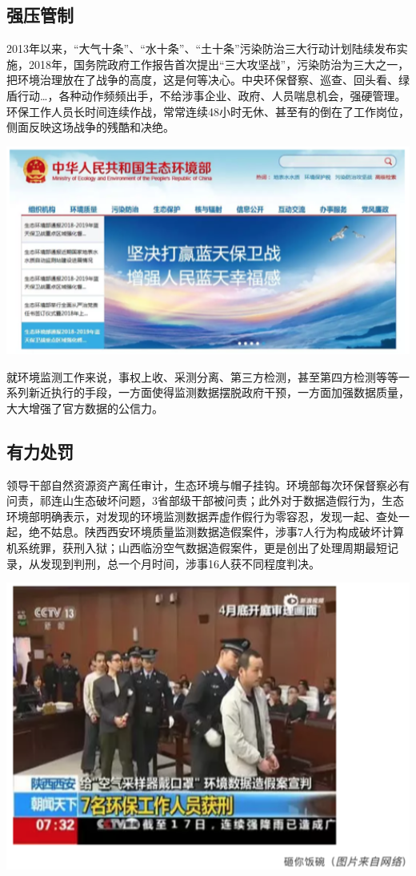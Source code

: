 \documentclass[]{book}
\begin{document}
\subsection{强压管制}

2013年以来，``大气十条''、``水十条''、``土十条''污染防治三大行动计划陆续发布实施，2018年，国务院政府工作报告首次提出``三大攻坚战''，污染防治为三大之一，把环境治理放在了战争的高度，这是何等决心。中央环保督察、巡查、回头看、绿盾行动\ldots{}，各种动作频频出手，不给涉事企业、政府、人员喘息机会，强硬管理。环保工作人员长时间连续作战，常常连续48小时无休、甚至有的倒在了工作岗位，侧面反映这场战争的残酷和决绝。

\includegraphics[width=6.67in]{images/fw3}

就环境监测工作来说，事权上收、采测分离、第三方检测，甚至第四方检测等等一系列新近执行的手段，一方面使得监测数据摆脱政府干预，一方面加强数据质量，大大增强了官方数据的公信力。

\subsection{有力处罚}

领导干部自然资源资产离任审计，生态环境与帽子挂钩。环境部每次环保督察必有问责，祁连山生态破坏问题，3省部级干部被问责；此外对于数据造假行为，生态环境部明确表示，对发现的环境监测数据弄虚作假行为零容忍，发现一起、查处一起，绝不姑息。陕西西安环境质量监测数据造假案件，涉事7人行为构成破坏计算机系统罪，获刑入狱；山西临汾空气数据造假案件，更是创出了处理周期最短记录，从发现到判刑，总一个月时间，涉事16人获不同程度判决。

\includegraphics[width=6.67in]{images/fw4}
\end{document}
